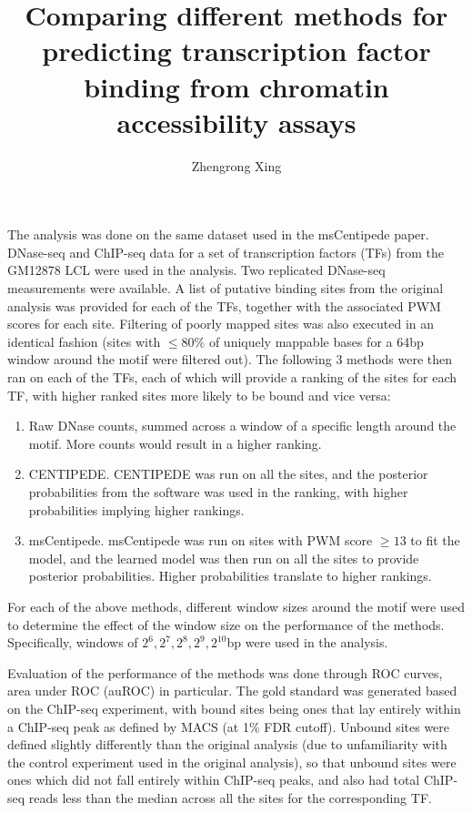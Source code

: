 \documentclass[12pt]{article}
\begin{document}
\title{\textbf{Comparing different methods for predicting transcription factor binding from chromatin accessibility assays}}
\author{Zhengrong Xing}
\date{}
\maketitle


The analysis was done on the same dataset used in the msCentipede paper. DNase-seq and ChIP-seq data for a set of transcription factors (TFs) from the GM12878 LCL were used in the analysis. Two replicated DNase-seq measurements were available. A list of putative binding sites from the original analysis was provided for each of the TFs, together with the associated PWM scores for each site. Filtering of poorly mapped sites was also executed in an identical fashion (sites with $\leq80\%$ of uniquely mappable bases for a 64bp window around the motif were filtered out). The following 3 methods were then ran on each of the TFs, each of which will provide a ranking of the sites for each TF, with higher ranked sites more likely to be bound and vice versa:
\begin{enumerate}
\item Raw DNase counts, summed across a window of a specific length around the motif. More counts would result in a higher ranking.
\item CENTIPEDE. CENTIPEDE was run on all the sites, and the posterior probabilities from the software was used in the ranking, with higher probabilities implying higher rankings.
\item msCentipede. msCentipede was run on sites with PWM score $\geq13$ to fit the model, and the learned model was then run on all the sites to provide posterior probabilities. Higher probabilities translate to higher rankings.
\end{enumerate}

For each of the above methods, different window sizes around the motif were used to determine the effect of the window size on the performance of the methods. Specifically, windows of $2^6,2^7,2^8,2^9,2^{10}$bp were used in the analysis.

Evaluation of the performance of the methods was done through ROC curves, area under ROC (auROC) in particular. The gold standard was generated based on the ChIP-seq experiment, with bound sites being ones that lay entirely within a ChIP-seq peak as defined by MACS (at 1\% FDR cutoff). Unbound sites were defined slightly differently than the original analysis (due to unfamiliarity with the control experiment used in the original analysis), so that unbound sites were ones which did not fall entirely within ChIP-seq peaks, and also had total ChIP-seq reads less than the median across all the sites for the corresponding TF.
\end{document}
